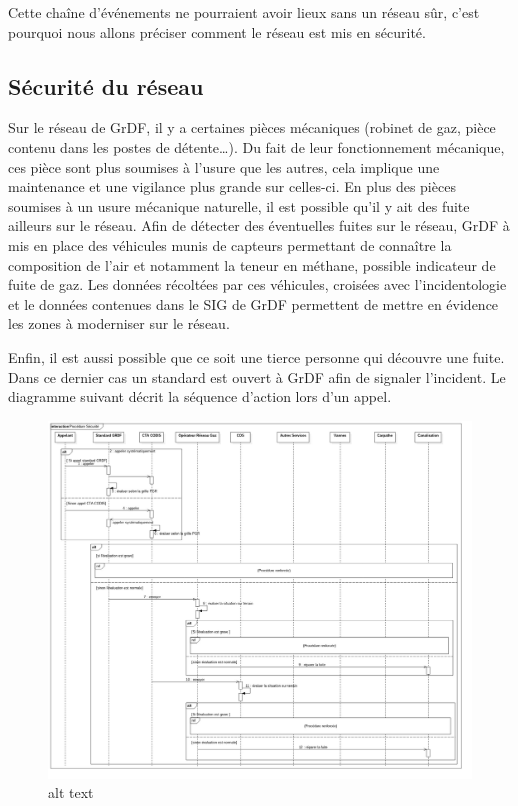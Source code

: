 \documentclass[
12pt,
french,                           %
a4paper,
]{article}
\begin{document}
Cette chaîne d'événements ne pourraient avoir lieux sans un réseau sûr,
c'est pourquoi nous allons préciser comment le réseau est mis en
sécurité.

\subsection{Sécurité du réseau}

Sur le réseau de GrDF, il y a certaines pièces mécaniques (robinet de
gaz, pièce contenu dans les postes de détente\ldots{}). Du fait de leur
fonctionnement mécanique, ces pièce sont plus soumises à l'usure que les
autres, cela implique une maintenance et une vigilance plus grande sur
celles-ci. En plus des pièces soumises à un usure mécanique naturelle,
il est possible qu'il y ait des fuite ailleurs sur le réseau. Afin de
détecter des éventuelles fuites sur le réseau, GrDF à mis en place des
véhicules munis de capteurs permettant de connaître la composition de
l'air et notamment la teneur en méthane, possible indicateur de fuite de
gaz. Les données récoltées par ces véhicules, croisées avec
l'incidentologie et le données contenues dans le SIG de GrDF permettent
de mettre en évidence les zones à moderniser sur le réseau.

Enfin, il est aussi possible que ce soit une tierce personne qui
découvre une fuite. Dans ce dernier cas un standard est ouvert à GrDF
afin de signaler l'incident. Le diagramme suivant décrit la séquence
d'action lors d'un appel.

\begin{figure}[htbp]
\centering
\includegraphics{DS-Securite.jpg}
\caption{alt text}
\end{figure}
\end{document}
